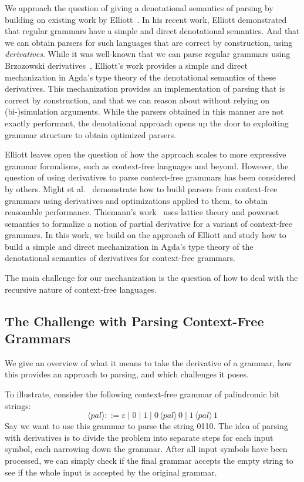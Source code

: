 We approach the question of giving a denotational semantics of parsing by building on existing work by Elliott~\cite{conal-languages}.
In his recent work, Elliott demonstrated that regular grammars have a simple and direct denotational semantics.
And that we can obtain parsers for such languages that are correct by construction, using \emph{derivatives}.
While it was well-known that we can parse regular grammars using Brzozowski derivatives~\cite{brzozowski}, Elliott's work provides a simple and direct mechanization in Agda's type theory of the denotational semantics of these derivatives.
This mechanization provides an implementation of parsing that is correct by construction, and that we can reason about without relying on (bi-)simulation arguments.
While the parsers obtained in this manner are not exactly performant, the denotational approach opens up the door to exploiting grammar structure to obtain optimized parsers.

Elliott leaves open the question of how the approach scales to more expressive grammar formalisms, such as context-free languages and beyond.
However, the question of using derivatives to parse context-free grammars has been considered by others.
Might et al.~\cite{parsing-with-derivatives} demonstrate how to build parsers from context-free grammars using derivatives and optimizations applied to them, to obtain reasonable performance.
Thiemann's work~\cite{Thiemann17} uses lattice theory and powerset semantics to formalize a notion of partial derivative for a variant of context-free grammars.
In this work, we build on the approach of Elliott and study how to build a simple and direct mechanization in Agda's type theory of the denotational semantics of derivatives for context-free grammars.

The main challenge for our mechanization is the question of how to deal with the recursive nature of context-free languages.

\subsection{The Challenge with Parsing Context-Free Grammars}

We give an overview of what it means to take the derivative of a grammar, how this provides an approach to parsing, and which challenges it poses.

To illustrate, consider the following context-free grammar of palindromic bit strings:
\[
\langle\mathit{pal}\rangle ::= ε \mid 0 \mid 1 \mid 0\, \langle\mathit{pal}\rangle\, 0 \mid 1\, \langle\mathit{pal}\rangle\, 1
\]
Say we want to use this grammar to parse the string 0110.
The idea of parsing with derivatives is to divide the problem into separate steps for each input symbol, each narrowing down the grammar.
After all input symbols have been processed, we can simply check if the final grammar accepts the empty string to see if the whole input is accepted by the original grammar.

